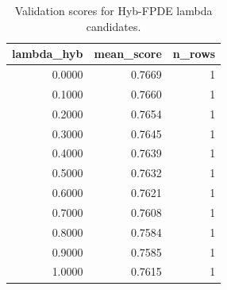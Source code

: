 \begin{table}[t]
\caption{Validation scores for Hyb-FPDE lambda candidates.}
\label{tab:lambda_distribution_computed}
\centering
\begin{tabular}{rrr}
\toprule
lambda\_hyb & mean\_score & n\_rows \\
\midrule
0.0000 & 0.7669 & 1 \\
0.1000 & 0.7660 & 1 \\
0.2000 & 0.7654 & 1 \\
0.3000 & 0.7645 & 1 \\
0.4000 & 0.7639 & 1 \\
0.5000 & 0.7632 & 1 \\
0.6000 & 0.7621 & 1 \\
0.7000 & 0.7608 & 1 \\
0.8000 & 0.7584 & 1 \\
0.9000 & 0.7585 & 1 \\
1.0000 & 0.7615 & 1 \\
\bottomrule
\end{tabular}

\end{table}
